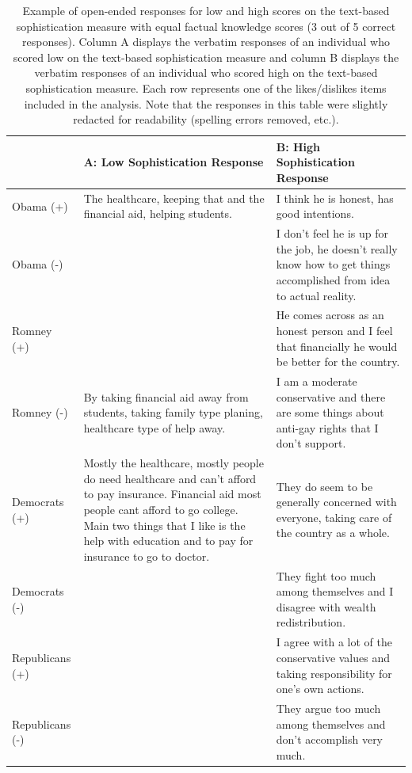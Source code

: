 \documentclass[12pt]{article}
\begin{document}
\begin{table}[ht]\footnotesize\centering
\begin{tabular}{l|p{6.5cm}|p{6.5cm}}
   \toprule
  & A: Low Sophistication Response & B: High Sophistication Response \\ 
   \midrule
   Obama (+) & The healthcare, keeping that and the financial aid, helping students. & I think he is honest, has good intentions. \\ \hdashline
     Obama (-) &  & I don't feel he is up for the job, he doesn't really know how to get things accomplished from idea to actual reality. \\ \hdashline
     Romney (+) &  & He comes across as an honest person and I feel that financially he would be better for the country. \\ \hdashline
     Romney (-) & By taking financial aid away from students, taking family type planing, healthcare type of help away. & I am a moderate conservative and there are some things about anti-gay rights that I don't support. \\ \hdashline
     Democrats (+) & Mostly the healthcare, mostly people do need healthcare and can't afford to pay insurance. Financial aid most people cant afford to go college. Main two things that I like is the help with education and to pay for insurance to go to doctor. & They do seem to be generally concerned with everyone, taking care of the country as a whole. \\ \hdashline
     Democrats (-) &  & They fight too much among themselves and I disagree with wealth redistribution. \\ \hdashline
     Republicans (+) &  & I agree with a lot of the conservative values and taking responsibility for one's own actions. \\ \hdashline
     Republicans (-) &  & They argue too much among themselves and don't accomplish very much. \\ 
    \bottomrule
 \end{tabular}
\caption{Example of open-ended responses for low and high scores on the text-based sophistication measure with equal factual knowledge scores (3 out of 5 correct responses). Column A displays the verbatim responses of an individual who scored low on the text-based sophistication measure and column B displays the verbatim responses of an individual who scored high on the text-based sophistication measure. Each row represents one of the likes/dislikes items included in the analysis. Note that the responses in this table were slightly redacted for readability (spelling errors removed, etc.).}\label{tab:ex1}
\end{table}
\end{document}
